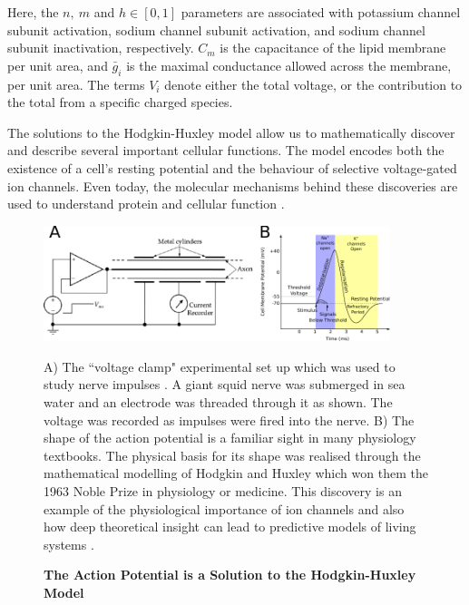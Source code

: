 Here, the $n,\ m$ and $h \in [0,1]$ parameters are associated with potassium channel subunit activation, sodium channel subunit activation, and sodium channel subunit inactivation, respectively. $C_m$ is the capacitance of the lipid membrane per unit area, and $\bar{g}_i$ is the maximal conductance allowed across the membrane, per unit area. The terms $V_i$ denote either the total voltage, or the contribution to the total from a specific charged species.

The solutions to the Hodgkin-Huxley model allow us to mathematically discover and describe several important cellular functions. The model encodes both the existence of a cell's resting potential and the behaviour of selective voltage-gated ion channels. Even today, the molecular mechanisms behind these discoveries are used to understand protein and cellular function \cite{aidley1996}. 

\begin{figure}
	\begin{center}
		\includegraphics[width=0.9\textwidth]{figures/Hodgkin-Huxley_action_potential.pdf}
	\end{center}
	\captionsetup{singlelinecheck = false, justification=raggedright}
	\caption[The Action Potential is a Solution to the Hodkin-Huxley Model] {\textbf{The Action Potential is a Solution to the Hodgkin-Huxley Model }}{ A) The ``voltage clamp" experimental set up which was used to study nerve impulses \cite{hodgkin_huxley_figure_website}. A giant squid nerve was submerged in sea water and an electrode was threaded through it as shown. The voltage was recorded as impulses were fired into the nerve. B) The shape of the action potential is a familiar sight in many physiology textbooks. The physical basis for its shape was realised through the mathematical modelling of Hodgkin and Huxley which won them the 1963 Noble Prize in physiology or medicine. This discovery is an example of the physiological importance of ion channels and also how deep theoretical insight can lead to predictive models of living systems \cite{hodgkin1952, hodgkin1952a, hodgkin1952b, hodgkin1952c, hodgkin1952d}.}
	\label{action_potential_graphic}
\end{figure}

